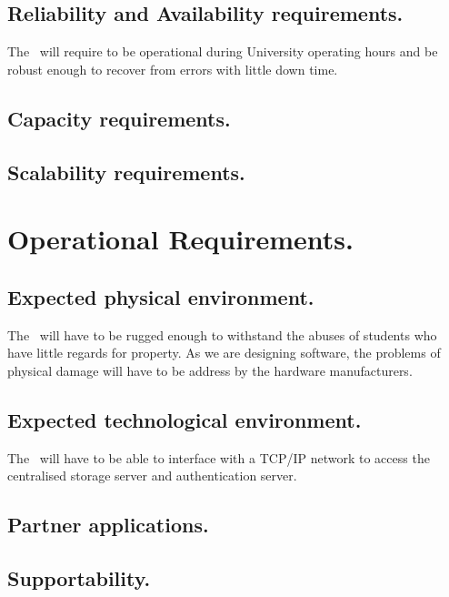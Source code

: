 \subsection{Reliability and Availability requirements.}

The \iDesk\ will require to be operational during University operating hours and be robust enough to recover from errors with little down time.

\subsection{Capacity requirements.}

\NA

\subsection{Scalability requirements.}

\NA

\section{Operational Requirements.}

\subsection{Expected physical environment.}

The \iDesk\ will have to be rugged enough to withstand the abuses of students who have little regards for property. As we are designing software, the problems of physical damage will have to be address by the hardware manufacturers.

\subsection{Expected technological environment.}

The \iDesk\ will have to be able to interface with a TCP/IP network to access the centralised storage server and authentication server.

\subsection{Partner applications.}

\NA

\subsection{Supportability.}

